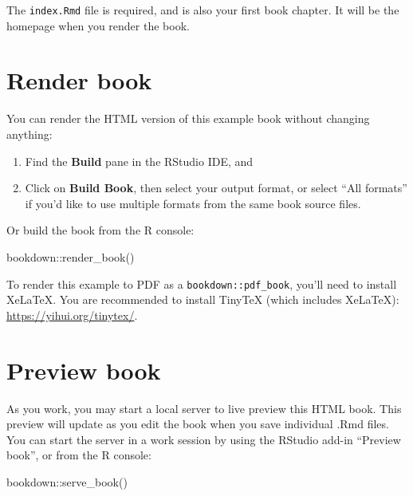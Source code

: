 \documentclass[12pt, oneside, openright]{byuthesis}
\newenvironment{Shaded}{\begin{snugshade}}{\end{snugshade}}
\newcommand{\FunctionTok}[1]{\textcolor[rgb]{0.00,0.00,0.00}{#1}}
\newcommand{\NormalTok}[1]{#1}
\newcommand{\SpecialCharTok}[1]{\textcolor[rgb]{0.00,0.00,0.00}{#1}}
\begin{document}
The \texttt{index.Rmd} file is required, and is also your first book chapter. It will be the homepage when you render the book.

\hypertarget{render-book}{%
\section{Render book}\label{render-book}}

You can render the HTML version of this example book without changing anything:

\begin{enumerate}
\def\labelenumi{\arabic{enumi}.}
\item
  Find the \textbf{Build} pane in the RStudio IDE, and
\item
  Click on \textbf{Build Book}, then select your output format, or select ``All formats'' if you'd like to use multiple formats from the same book source files.
\end{enumerate}

Or build the book from the R console:

\begin{Shaded}
\begin{Highlighting}[]
\NormalTok{bookdown}\SpecialCharTok{::}\FunctionTok{render\_book}\NormalTok{()}
\end{Highlighting}
\end{Shaded}

To render this example to PDF as a \texttt{bookdown::pdf\_book}, you'll need to install XeLaTeX. You are recommended to install TinyTeX (which includes XeLaTeX): \url{https://yihui.org/tinytex/}.

\hypertarget{preview-book}{%
\section{Preview book}\label{preview-book}}

As you work, you may start a local server to live preview this HTML book. This preview will update as you edit the book when you save individual .Rmd files. You can start the server in a work session by using the RStudio add-in ``Preview book'', or from the R console:

\begin{Shaded}
\begin{Highlighting}[]
\NormalTok{bookdown}\SpecialCharTok{::}\FunctionTok{serve\_book}\NormalTok{()}
\end{Highlighting}
\end{Shaded}
\end{document}
